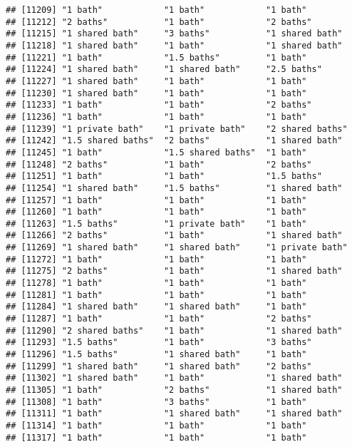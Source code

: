 \documentclass[
]{article}
\begin{document}
\begin{verbatim}
## [11209] "1 bath"            "1 bath"            "1 bath"           
## [11212] "2 baths"           "1 bath"            "2 baths"          
## [11215] "1 shared bath"     "3 baths"           "1 shared bath"    
## [11218] "1 shared bath"     "1 bath"            "1 shared bath"    
## [11221] "1 bath"            "1.5 baths"         "1 bath"           
## [11224] "1 shared bath"     "1 shared bath"     "2.5 baths"        
## [11227] "1 shared bath"     "1 bath"            "1 bath"           
## [11230] "1 shared bath"     "1 bath"            "1 bath"           
## [11233] "1 bath"            "1 bath"            "2 baths"          
## [11236] "1 bath"            "1 bath"            "1 bath"           
## [11239] "1 private bath"    "1 private bath"    "2 shared baths"   
## [11242] "1.5 shared baths"  "2 baths"           "1 shared bath"    
## [11245] "1 bath"            "1.5 shared baths"  "1 bath"           
## [11248] "2 baths"           "1 bath"            "2 baths"          
## [11251] "1 bath"            "1 bath"            "1.5 baths"        
## [11254] "1 shared bath"     "1.5 baths"         "1 shared bath"    
## [11257] "1 bath"            "1 bath"            "1 bath"           
## [11260] "1 bath"            "1 bath"            "1 bath"           
## [11263] "1.5 baths"         "1 private bath"    "1 bath"           
## [11266] "2 baths"           "1 bath"            "1 shared bath"    
## [11269] "1 shared bath"     "1 shared bath"     "1 private bath"   
## [11272] "1 bath"            "1 bath"            "1 bath"           
## [11275] "2 baths"           "1 bath"            "1 shared bath"    
## [11278] "1 bath"            "1 bath"            "1 bath"           
## [11281] "1 bath"            "1 bath"            "1 bath"           
## [11284] "1 shared bath"     "1 shared bath"     "1 bath"           
## [11287] "1 bath"            "1 bath"            "2 baths"          
## [11290] "2 shared baths"    "1 bath"            "1 shared bath"    
## [11293] "1.5 baths"         "1 bath"            "3 baths"          
## [11296] "1.5 baths"         "1 shared bath"     "1 bath"           
## [11299] "1 shared bath"     "1 shared bath"     "2 baths"          
## [11302] "1 shared bath"     "1 bath"            "1 shared bath"    
## [11305] "1 bath"            "2 baths"           "1 shared bath"    
## [11308] "1 bath"            "3 baths"           "1 bath"           
## [11311] "1 bath"            "1 shared bath"     "1 shared bath"    
## [11314] "1 bath"            "1 bath"            "1 bath"           
## [11317] "1 bath"            "1 bath"            "1 bath"           

\end{verbatim}
\end{document}
